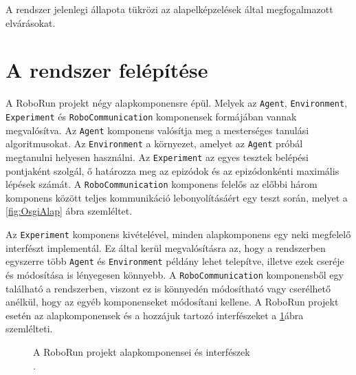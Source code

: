 A rendszer jelenlegi állapota tükrözi az alapelképzelések által megfogalmazott elvárásokat.


\section{A rendszer felépítése}\label{sec:Felepites}
A RoboRun projekt négy alapkomponensre épül. Melyek az \texttt{Agent}, \texttt{Environment}, \texttt{Experiment} és \texttt{RoboCommunication} komponensek formájában vannak megvalósítva. Az \texttt{Agent} komponens valósítja meg a mesterséges tanulási algoritmusokat. Az \texttt{Environment} a környezet, amelyet az \texttt{Agent} próbál megtanulni helyesen használni. Az \texttt{Experiment} az egyes tesztek belépési pontjaként szolgál, ő határozza meg az epizódok és az epizódonkénti maximális lépések számát. A \texttt{RoboCommunication} komponens felelős az előbbi három komponens között teljes kommunikáció lebonyolításáért egy teszt során, melyet a \ref{fig:OsgiAlap} ábra szemléltet.


Az \texttt{Experiment} komponens kivételével, minden alapkomponens egy neki megfelelő interfészt implementál. Ez által kerül megvalósításra az, hogy a rendszerben egyszerre több \texttt{Agent} és \texttt{Environment} példány lehet telepítve, illetve ezek cseréje és módosítása is lényegesen könnyebb. A \texttt{RoboCommunication} komponensből egy található a rendszerben, viszont ez is könnyedén módosítható vagy cserélhető anélkül, hogy az egyéb komponenseket módosítani kellene.  A RoboRun projekt esetén az alapkomponensek és a hozzájuk tartozó interfészeket a \ref{fig:RoboRunKompEsInterfesz}ábra szemlélteti.

\begin{figure}[h!]
  \centering
  \caption[A RoboRun projekt alapkomponensei és interfészek]%
  {A RoboRun projekt alapkomponensei és interfészek\\
  {\white .}\hfill\url{}}
  \label{fig:RoboRunKompEsInterfesz}
\end{figure}


